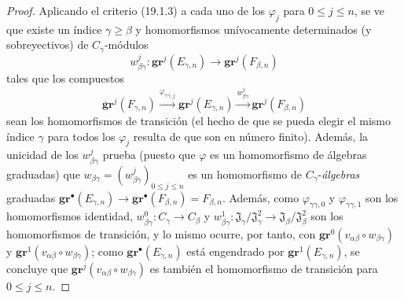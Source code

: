 \begin{proof}
Aplicando el criterio (19.1.3) a cada uno de los $\varphi_j$ para $0\leq j\leq n$,
se ve que existe un índice $\gamma\geq\beta$ y homomorfismos
unívocamente determinados (y sobreyectivos) de $C_\gamma$-módulos
\[
  w_{\beta\gamma}^j:\mathbf{gr}^j(E_{\gamma,n})\longrightarrow
  \mathbf{gr}^j(F_{\beta,n})
\]
tales que los compuestos
\[
  \mathbf{gr}^j(F_{\gamma,n})
  \xrightarrow{\varphi_{\gamma\gamma,j}}\mathbf{gr}^j(E_{\gamma,n})
  \xrightarrow{w_{\beta\gamma}^j}\mathbf{gr}^j(F_{\beta,n})
\]
sean los homomorfismos de transición (el hecho de que se pueda elegir el mismo
índice $\gamma$ para todos los $\varphi_j$ resulta de que son en número
finito). Además, la unicidad de los $w_{\beta\gamma}^j$ prueba (puesto que $\varphi$ es
un homomorfismo de álgebras graduadas) que
$w_{\beta\gamma}=(w_{\beta\gamma}^j)_{0\leq j\leq n}$ es un homomorfismo de
$C_\gamma$-\emph{álgebras} graduadas
$\mathbf{gr}^\bullet(E_{\gamma,n})\to\mathbf{gr}^\bullet(F_{\beta,n})=F_{\beta,n}$.
Además, como $\varphi_{\gamma\gamma,0}$ y $\varphi_{\gamma\gamma,1}$ son
los homomorfismos identidad,
$w_{\beta\gamma}^0:C_\gamma\to C_\beta$ y
$w_{\beta\gamma}^1:\mathfrak J_\gamma/\mathfrak J_\gamma^2
\to\mathfrak J_\beta/\mathfrak J_\beta^2$ son los homomorfismos de
transición, y lo mismo ocurre, por tanto, con
$\mathbf{gr}^0(v_{\alpha\beta}\circ w_{\beta\gamma})$ y
$\mathbf{gr}^1(v_{\alpha\beta}\circ w_{\beta\gamma})$; como
$\mathbf{gr}^\bullet(E_{\gamma,n})$ está engendrado por $\mathbf{gr}^1(E_{\gamma,n})$, se concluye que
$\mathbf{gr}^j(v_{\alpha\beta}\circ w_{\beta\gamma})$ es también el homomorfismo de
transición para $0\leq j\leq n$.


\end{proof}
